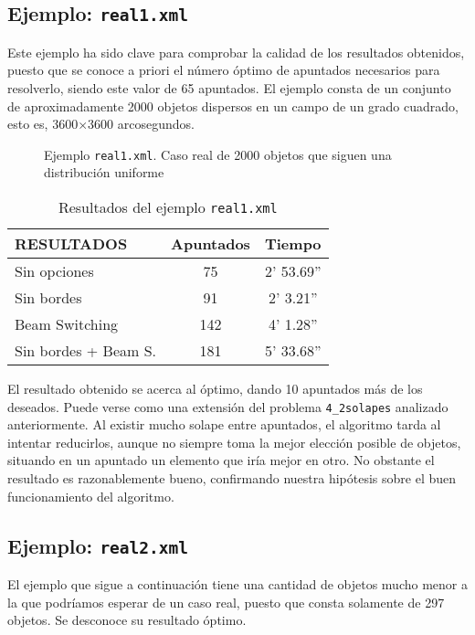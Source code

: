 \subsection {Ejemplo: \texttt{real1.xml}}
Este ejemplo ha sido clave para comprobar la calidad de los resultados
obtenidos, puesto que se conoce a priori el número óptimo de apuntados
necesarios para resolverlo, siendo este valor de 65 apuntados. El ejemplo
consta de un conjunto de aproximadamente 2000 objetos dispersos en un campo de un
grado cuadrado, esto es, 3600$\times$3600 arcosegundos.

\begin{figure}[!htb]
\centering
{}
\caption{Ejemplo \texttt{real1.xml}. Caso real de 2000 objetos que siguen una distribución uniforme}
\end{figure}

\begin{table*}[!ht]
\centering
\begin{tabular}{||l||c|c||}
\hline
\hline
RESULTADOS & Apuntados & Tiempo \\
\hline
\hline
Sin opciones & 75 & 2' 53.69'' \\
\hline
Sin bordes &91 & 2' 3.21'' \\
\hline
Beam Switching & 142 & 4' 1.28'' \\
\hline
Sin bordes + Beam S. & 181& 5' 33.68'' \\
\hline
\hline
\end{tabular}
\caption{Resultados del ejemplo \texttt{real1.xml}}
\end{table*}

El resultado obtenido se acerca al óptimo, dando 10 apuntados más de
los deseados. Puede verse como una extensión del problema \texttt{4\_2solapes}
analizado anteriormente. Al existir mucho solape entre apuntados, el algoritmo
tarda al intentar reducirlos, aunque no siempre toma la mejor elección
posible de objetos, situando en un apuntado un elemento que iría mejor en otro.
No obstante el resultado es razonablemente bueno, confirmando nuestra hipótesis sobre
el buen funcionamiento del algoritmo.

\subsection {Ejemplo: \texttt{real2.xml}}
El ejemplo que sigue a continuación tiene una cantidad de objetos mucho menor a
la que podríamos esperar de un caso real, puesto que consta solamente de 297
objetos. Se desconoce su resultado óptimo.

